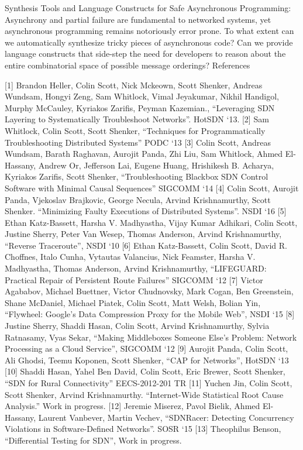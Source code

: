 Synthesis Tools and Language Constructs for Safe Asynchronous Programming: Asynchrony and partial failure are fundamental to networked systems, yet asynchronous programming remains notoriously error prone. To what extent can we automatically synthesize tricky pieces of asynchronous code? Can we provide language constructs that side-step the need for developers to reason about the entire combinatorial space of possible message orderings?
References

[1] Brandon Heller, Colin Scott, Nick Mckeown, Scott Shenker, Andreas Wundsam, Hongyi Zeng, Sam Whitlock, Vimal Jeyakumar, Nikhil Handigol, Murphy McCauley, Kyriakos Zarifis, Peyman Kazemian., “Leveraging SDN Layering to Systematically Troubleshoot Networks”. HotSDN ‘13.
[2] Sam Whitlock, Colin Scott, Scott Shenker, “Techniques for Programmatically Troubleshooting Distributed Systems” PODC ‘13
[3] Colin Scott, Andreas Wundsam, Barath Raghavan, Aurojit Panda, Zhi Liu, Sam Whitlock, Ahmed El-Hassany, Andrew Or, Jefferson Lai, Eugene Huang, Hrishikesh B. Acharya, Kyriakos Zarifis, Scott Shenker, “Troubleshooting Blackbox SDN Control Software with Minimal Causal Sequences” SIGCOMM ‘14
[4] Colin Scott, Aurojit Panda, Vjekoslav Brajkovic, George Necula, Arvind Krishnamurthy, Scott Shenker. “Minimizing Faulty Executions of Distributed Systems”. NSDI ‘16
[5] Ethan Katz-Bassett, Harsha V. Madhyastha, Vijay Kumar Adhikari, Colin Scott, Justine Sherry, Peter Van Wesep, Thomas Anderson, Arvind Krishnamurthy, “Reverse Traceroute”, NSDI ‘10
[6] Ethan Katz-Bassett, Colin Scott, David R. Choffnes, Italo Cunha, Vytautas Valancius, Nick Feamster, Harsha V. Madhyastha, Thomas Anderson, Arvind Krishnamurthy, “LIFEGUARD: Practical Repair of Persistent Route Failures” SIGCOMM ‘12
[7] Victor Agababov, Michael Buettner, Victor Chudnovsky, Mark Cogan, Ben Greenstein, Shane McDaniel, Michael Piatek, Colin Scott, Matt Welsh, Bolian Yin, “Flywheel: Google's Data Compression Proxy for the Mobile Web”, NSDI ‘15
[8] Justine Sherry, Shaddi Hasan, Colin Scott, Arvind Krishnamurthy, Sylvia Ratnasamy, Vyas Sekar, “Making Middleboxes Someone Else's Problem: Network Processing as a Cloud Service”, SIGCOMM ‘12
[9] Aurojit Panda, Colin Scott, Ali Ghodsi, Teemu Koponen, Scott Shenker, “CAP for Networks”, HotSDN ‘13
[10] Shaddi Hasan, Yahel Ben David, Colin Scott, Eric Brewer, Scott Shenker,  “SDN for Rural Connectivity” EECS-2012-201 TR
[11] Yuchen Jin, Colin Scott, Scott Shenker, Arvind Krishnamurthy. “Internet-Wide Statistical Root Cause Analysis.” Work in progress.
[12] Jeremie Miserez, Pavol Bielik, Ahmed El-Hassany, Laurent Vanbever, Martin Vechev, “SDNRacer: Detecting Concurrency Violations in Software-Defined Networks”. SOSR ‘15
[13] Theophilus Benson, “Differential Testing for SDN”, Work in progress.

